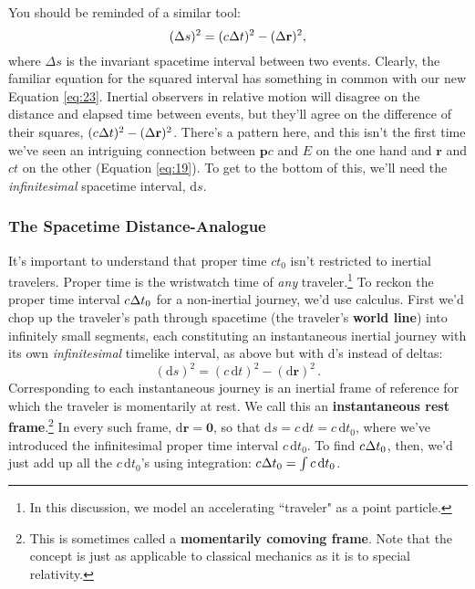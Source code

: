 \documentclass[12pt]{article}
\renewcommand{\vv}[1]{\mathbf{#1}}
\newcommand{\dd}[1]{\mathrm{d}#1}
\begin{document}
You should be reminded of a similar tool:
\begin{equation*}
(\Delta s)^2 = (c \mkern.5mu \Delta t)^2 - (\Delta \vv r)^2,
\end{equation*}
where $\Delta s$ is the invariant spacetime interval between two events. Clearly, the familiar equation for the squared interval has something in common with our new Equation \ref{eq:23}. Inertial observers in relative motion will disagree on the distance and elapsed time between events, but they'll agree on the difference of their squares, $(c \mkern.5mu \Delta t)^2 - (\Delta \vv r)^2$. There's a pattern here, and this isn't the first time we've seen an intriguing connection between $\vv p c$ and $E$ on the one hand and $\vv r$ and $ct$ on the other (Equation \ref{eq:19}). To get to the bottom of this, we'll need the \emph{infinitesimal} spacetime interval, $\dd s$.

\subsubsection{The Spacetime Distance-Analogue}\label{sssec:ds}

It's important to understand that proper time $ct_0$ isn't restricted to inertial travelers. Proper time is the wristwatch time of \emph{any} traveler.\footnote{\label{fn:tr}In this discussion, we model an accelerating ``traveler" as a point particle.} To reckon the proper time interval $c \mkern.5mu \Delta t_0$ for a non-inertial journey, we'd use calculus. First we'd chop up the traveler's path through spacetime (the traveler's \textbf{world line}) into infinitely small segments, each constituting an instantaneous inertial journey with its own \emph{infinitesimal} timelike interval, as above but with d's instead of deltas:
\begin{equation}\label{eq:24}
\boxed{(\dd s)^2 =(c \, \dd t)^2 - (\dd \vv r)^2} \, .
\end{equation}
Corresponding to each instantaneous journey is an inertial frame of reference for which the traveler is momentarily at rest. We call this an \textbf{instantaneous rest frame}.\footnote{This is sometimes called a \textbf{momentarily comoving frame}. Note that the concept is just as applicable to classical mechanics as it is to special relativity.} In every such frame, $\dd \vv r = \vv 0$, so that $\dd s = c \,\dd t = c \, \dd t_0$, where we've introduced the infinitesimal proper time interval $c \, \dd t_0$. To find $c \mkern.5mu \Delta t_0$, then, we'd just add up all the $c \, \dd t_0$'s using integration: $c \mkern.5mu \Delta t_0 = \int c \, \dd t_0$.
\end{document}
